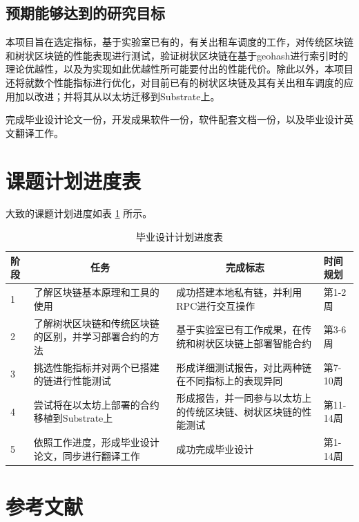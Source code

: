 \documentclass[type=undergraduate_proposal]{bitreport}
\begin{document}
\subsection{预期能够达到的研究目标}
本项目旨在选定指标，基于实验室已有的，有关出租车调度的工作，对传统区块链和树状区块链的性能表现进行测试，验证树状区块链在基于geohash进行索引时的理论优越性，以及为实现如此优越性所可能要付出的性能代价。除此以外，本项目还将就数个性能指标进行优化，对目前已有的树状区块链及其有关出租车调度的应用加以改进；并将其从以太坊迁移到Substrate上。

完成毕业设计论文一份，开发成果软件一份，软件配套文档一份，以及毕业设计英文翻译工作。

\section{课题计划进度表}
大致的课题计划进度如表 \ref{tab:progress} 所示。

\begin{table}[!ht]
  \centering
  \caption{毕业设计计划进度表}
  \label{tab:progress}
  \begin{tabular}{lp{4cm}p{4cm}p{3cm}}
    \toprule
    阶段 & \multicolumn{1}{c}{任务}                               & \multicolumn{1}{c}{完成标志}                                   & 时间规划  \\ \midrule
    1    & 了解区块链基本原理和工具的使用                         & 成功搭建本地私有链，并利用RPC进行交互操作                      & 第1-2周   \\ \midrule
    2    & 了解树状区块链和传统区块链的区别，并学习部署合约的方法 & 基于实验室已有工作成果，在传统和树状区块链上部署智能合约       & 第3-6周   \\ \midrule
    3    & 挑选性能指标并对两个已搭建的链进行性能测试             & 形成详细测试报告，对比两种链在不同指标上的表现异同             & 第7-10周  \\ \midrule
    4    & 尝试将在以太坊上部署的合约移植到Substrate上            & 形成报告，并一同参与以太坊上的传统区块链、树状区块链的性能测试 & 第11-14周 \\ \midrule
    5    & 依照工作进度，形成毕业设计论文，同步进行翻译工作       & 成功完成毕业设计                                               & 第1-14周  \\ \bottomrule
  \end{tabular}
\end{table}

\section{参考文献}
\printbibliography[heading=none]
\end{document}
